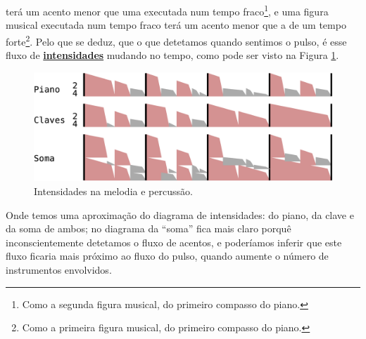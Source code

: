 terá um acento menor que uma executada num tempo fraco\footnote{Como
a segunda figura musical, do primeiro compasso do piano.}, 
e uma figura musical executada num tempo fraco terá um acento menor que a de um tempo forte\footnote{Como
a primeira figura musical, do primeiro compasso do piano.}.
Pelo que se deduz, que o que detetamos quando sentimos o pulso, 
é esse fluxo de \hyperref[sec:pos:Intensidade]{\textbf{intensidades}} mudando no tempo, 
como pode ser visto na Figura \ref{ritmo:procurando-pulso2}.
\begin{figure}[!h]
\centering
    \includegraphics[width=\textwidth]{chapters/cap-musicalidade-percepcion/procurando-pulso2.eps}
\caption{Intensidades na melodia e percussão.}
\label{ritmo:procurando-pulso2}
\end{figure}
Onde temos uma aproximação do diagrama de intensidades: do piano, da clave e da soma de ambos;
no diagrama da ``soma'' fica mais claro porquê inconscientemente detetamos o fluxo de acentos,
e poderíamos inferir que este fluxo ficaria mais próximo ao fluxo do pulso, 
quando aumente o número de instrumentos envolvidos.


